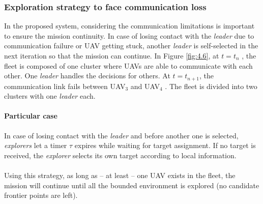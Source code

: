 \documentclass[11pt,openany]{book}
\begin{document}
\begin{algorimth}[H]
\subsubsection{Exploration strategy to face communication loss}
In the proposed system, considering the communication limitations is important to ensure the mission continuity. In case of losing contact with the \textit{leader} due to communication failure or UAV getting stuck, another \textit{leader} is self-selected in the next iteration so that the mission can continue. In Figure \ref{fig:4.6}, at $t=t_n$ , the ﬂeet is composed of one cluster where UAVs are able to communicate with each other. One \textit{leader} handles the decisions for others. At $t=t_{n+1}$, the communication link fails between UAV$_3$ and UAV$_4$ . The ﬂeet is divided into two clusters with one \textit{leader} each.
\paragraph{Particular case}
In case of losing contact with the \textit{leader} and before another one is selected, \textit{explorers} let a timer $\tau$ expires while waiting for target assignment. If no target is received, the \textit{explorer} selects its own target according to local information.\\\\
Using this strategy, as long as – at least – one UAV exists in the ﬂeet, the mission will continue until all the bounded environment is explored (no candidate frontier points are left).

\end{algorimth}
\end{document}
